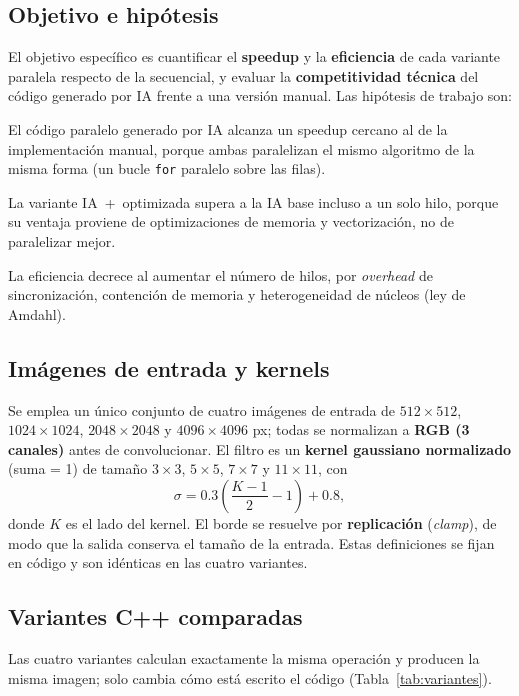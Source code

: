 \documentclass[12pt]{article}
\begin{document}
\subsection{Objetivo e hipótesis}
\label{subsec:objetivo}
El objetivo específico es cuantificar el \textbf{speedup} y la \textbf{eficiencia}
de cada variante paralela respecto de la secuencial, y evaluar la
\textbf{competitividad técnica} del código generado por IA frente a una versión
manual. Las hipótesis de trabajo son:
\begin{description}[leftmargin=1.4em,itemsep=1pt]
  \item[H1.] El código paralelo generado por IA alcanza un speedup cercano al de
  la implementación manual, porque ambas paralelizan el mismo algoritmo de la
  misma forma (un bucle \texttt{for} paralelo sobre las filas).
  \item[H2.] La variante IA~+~optimizada supera a la IA base incluso a un solo
  hilo, porque su ventaja proviene de optimizaciones de memoria y vectorización,
  no de paralelizar mejor.
  \item[H3.] La eficiencia decrece al aumentar el número de hilos, por
  \emph{overhead} de sincronización, contención de memoria y heterogeneidad de
  núcleos (ley de Amdahl).
\end{description}

\subsection{Imágenes de entrada y kernels}
\label{subsec:datos}
Se emplea un único conjunto de cuatro imágenes de entrada de $512\times512$,
$1024\times1024$, $2048\times2048$ y $4096\times4096$ px; todas se normalizan a
\textbf{RGB (3 canales)} antes de convolucionar. El filtro es un \textbf{kernel
gaussiano normalizado} (suma = 1) de tamaño $3\times3$, $5\times5$, $7\times7$ y
$11\times11$, con
\begin{equation}
  \sigma = 0.3\left(\frac{K-1}{2}-1\right) + 0.8 ,
  \label{eq:sigma}
\end{equation}
donde $K$ es el lado del kernel. El borde se resuelve por
\textbf{replicación} (\emph{clamp}), de modo que la salida conserva el tamaño de
la entrada. Estas definiciones se fijan en código y son idénticas en las cuatro
variantes.

\subsection{Variantes C++ comparadas}
\label{subsec:variantes}
Las cuatro variantes calculan exactamente la misma operación y producen la misma
imagen; solo cambia cómo está escrito el código (Tabla~\ref{tab:variantes}).
\end{document}
